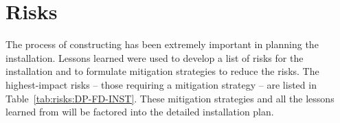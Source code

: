 \section{Risks}
The process of constructing  has been extremely important in planning the  installation. Lessons learned were used to develop a list of risks for the  installation and to formulate mitigation strategies to reduce the risks. The highest-impact risks -- those requiring a mitigation strategy -- are listed in Table~\ref{tab:risks:DP-FD-INST}. These mitigation strategies and all the lessons learned from
 will be factored into the detailed installation plan.


